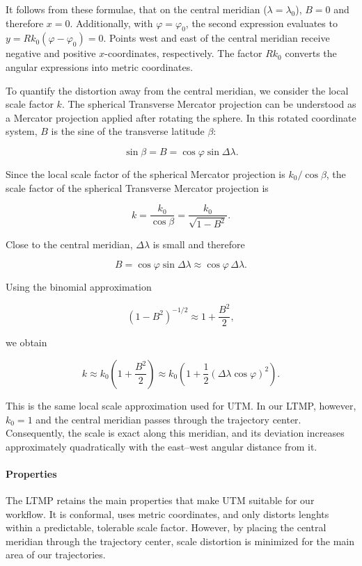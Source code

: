 It follows from these formulae, that on the central meridian ($\lambda = \lambda_0$), $B = 0$ and therefore $x = 0$. 
Additionally, with $\varphi = \varphi_0$, the second expression evaluates to $y = Rk_0(\varphi - \varphi_0)=0$.
Points west and east of the central meridian receive negative and positive $x$-coordinates, respectively. The factor $Rk_0$ 
converts the angular expressions into metric coordinates.

To quantify the distortion away from the central meridian, we consider the local scale factor \(k\). 
The spherical Transverse Mercator projection can be understood as a Mercator projection applied after rotating the sphere. 
In this rotated coordinate system, \(B\) is the sine of the transverse latitude \(\beta\):

$$
\sin\beta
=
B
=
\cos\varphi\sin\Delta\lambda.
$$

Since the local scale factor of the spherical Mercator projection is \(k_0/\cos\beta\), the scale factor of the spherical Transverse Mercator projection is

$$
k
=
\frac{k_0}{\cos\beta}
=
\frac{k_0}{\sqrt{1-B^2}}.
$$

Close to the central meridian, \(\Delta\lambda\) is small and therefore

$$
B
=
\cos\varphi\sin\Delta\lambda
\approx
\cos\varphi\,\Delta\lambda.
$$

Using the binomial approximation

$$
(1-B^2)^{-1/2}
\approx
1+\frac{B^2}{2},
$$

we obtain

$$
k
\approx
k_0\left(1+\frac{B^2}{2}\right)
\approx
k_0\left(
1+\frac{1}{2}
(\Delta\lambda\cos\varphi)^2\right).
$$

This is the same local scale approximation used for UTM. 
In our LTMP, however, \(k_0=1\) and the central meridian passes through the trajectory center. 
Consequently, the scale is exact along this meridian, and its deviation increases approximately quadratically with the east--west
angular distance from it.

\paragraph{Properties}
The LTMP retains the main properties that make UTM suitable for our workflow. It is conformal, uses metric coordinates, and only distorts lenghts within a predictable,
tolerable scale factor.
However, by placing the central meridian through the trajectory center, scale distortion is minimized for the main area of our trajectories.


